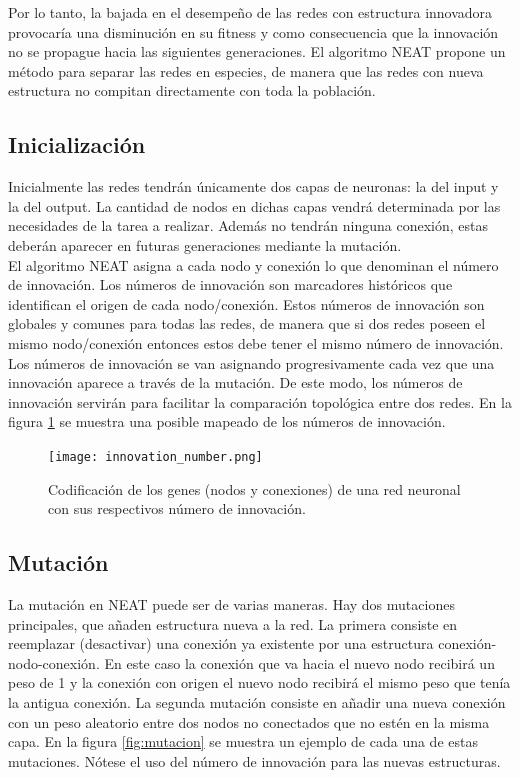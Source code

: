\documentclass{article}
\begin{document}
Por lo tanto, la bajada en el desempeño de las redes con estructura innovadora provocaría una disminución en su fitness y como consecuencia que la innovación no se propague hacia las siguientes generaciones. El algoritmo NEAT propone un método para separar las redes en especies, de manera que las redes con nueva estructura no compitan directamente con toda la población.\\
\subsection{Inicialización}
Inicialmente las redes tendrán únicamente dos capas de neuronas: la del input y la del output. La cantidad de nodos en dichas capas vendrá determinada por las necesidades de la tarea a realizar. Además no tendrán ninguna conexión, estas deberán aparecer en futuras generaciones mediante la mutación.\\

El algoritmo NEAT asigna a cada nodo y conexión lo que denominan el número de innovación. Los números de innovación son marcadores históricos que identifican el origen de cada nodo/conexión. Estos números de innovación son globales y comunes para todas las redes, de manera que si dos redes poseen el mismo nodo/conexión entonces estos debe tener el mismo número de innovación. Los números de innovación se van asignando progresivamente cada vez que una innovación aparece a través de la mutación. De este modo, los números de innovación servirán para facilitar la comparación topológica entre dos redes. En la figura \ref{fig:inn} se muestra una posible mapeado de los números de innovación.

\begin{figure}[htbp]
\centering
\texttt{[image: innovation\_number.png]}
\caption{Codificación de los genes (nodos y conexiones) de una red neuronal con sus respectivos número de innovación.}
\label{fig:inn}
\end{figure}



\subsection{Mutación}
La mutación en NEAT puede ser de varias maneras. Hay dos mutaciones principales, que añaden estructura nueva a la red. La primera consiste en reemplazar (desactivar) una conexión ya existente por una estructura conexión-nodo-conexión. En este caso la conexión que va hacia el nuevo nodo recibirá un peso de 1 y la conexión con origen el nuevo nodo recibirá el mismo peso que tenía la antigua conexión. La segunda mutación consiste en añadir una nueva conexión con un peso aleatorio entre dos nodos no conectados que no estén en la misma capa. En la figura \ref{fig:mutacion} se muestra un ejemplo de cada una de estas mutaciones. Nótese el uso del número de innovación para las nuevas estructuras.\\
\end{document}
